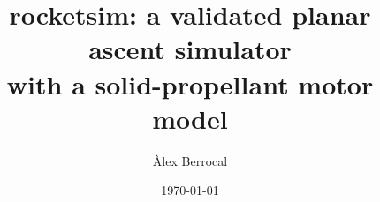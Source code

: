 \documentclass[11pt,a4paper]{article}
\title{rocketsim: a validated planar ascent simulator\\
       with a solid-propellant motor model}
\author{Àlex Berrocal}
\date{\today}
\begin{document}
\maketitle

\begin{abstract}

\end{abstract}

\tableofcontents %
\clearpage










\nocite{*} %



\appendix



\end{document}
